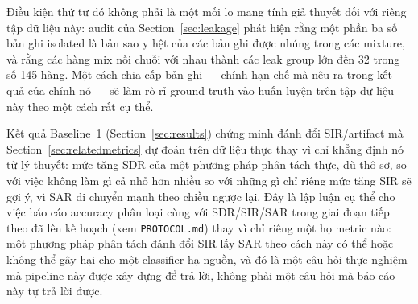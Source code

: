 \documentclass[11pt]{article}
\begin{document}
Điều kiện thứ tư đó không phải là một mối lo mang tính giả thuyết đối
với riêng tập dữ liệu này: audit của Section~\ref{sec:leakage} phát hiện
rằng một phần ba số bản ghi isolated là bản sao y hệt của các bản ghi
được nhúng trong các mixture, và rằng các hàng mix nối chuỗi với nhau
thành các leak group lớn đến 32 trong số 145 hàng. Một cách chia cấp bản
ghi --- chính hạn chế mà \cite{nmfcrnn} nêu ra trong kết quả của chính
nó --- sẽ làm rò rỉ ground truth vào huấn luyện trên tập dữ liệu này
theo một cách rất cụ thể.

Kết quả Baseline~1 (Section~\ref{sec:results}) chứng minh đánh đổi
SIR/artifact mà Section~\ref{sec:relatedmetrics} dự đoán trên dữ liệu
thực thay vì chỉ khẳng định nó từ lý thuyết: mức tăng SDR của một phương
pháp phân tách thực, dù thô sơ, so với việc không làm gì cả nhỏ hơn
nhiều so với những gì chỉ riêng mức tăng SIR sẽ gợi ý, vì SAR di chuyển
mạnh theo chiều ngược lại. Đây là lập luận cụ thể cho việc báo cáo
accuracy phân loại cùng với SDR/SIR/SAR trong giai đoạn tiếp theo đã lên
kế hoạch (xem \texttt{PROTOCOL.md}) thay vì chỉ riêng một họ metric nào:
một phương pháp phân tách đánh đổi SIR lấy SAR theo cách này có thể hoặc
không thể gây hại cho một classifier hạ nguồn, và đó là một câu hỏi thực
nghiệm mà pipeline này được xây dựng để trả lời, không phải một câu hỏi
mà báo cáo này tự trả lời được.
\end{document}
